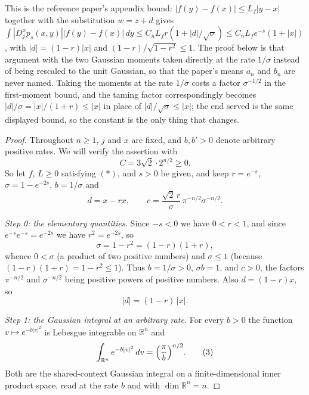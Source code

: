 \begin{lemma}
This is the reference paper's appendix bound: $|f(y)-f(x)| \leq L_f|y-x|$ together with
the substitution $w = z + d$ gives
$\int|D_j^xp_s(x,y)||f(y)-f(x)|\,dy \leq C_nL_fr(1+|d|/\sqrt\sigma) \leq C_nL_fe^{-s}(1+|x|)$,
with $|d| = (1-r)|x|$ and $(1-r)/\sqrt{1-r^2} \leq 1$.  The proof below is that argument
with the two Gaussian moments taken directly at the rate $1/\sigma$ instead of being
rescaled to the unit Gaussian, so that the paper's means $a_n$ and $b_n$ are never
named.  Taking the moments at the rate $1/\sigma$ costs a factor $\sigma^{-1/2}$ in the
first-moment bound, and the taming factor correspondingly becomes
$|d|/\sigma = |x|/(1+r) \leq |x|$ in place of $|d|/\sqrt\sigma \leq |x|$; the end served
is the same displayed bound, so the constant is the only thing that changes.
\end{lemma}
\begin{proof}
Throughout $n \geq 1$, $j$ and $x$ are fixed, and $b, b' > 0$ denote arbitrary positive
rates.  We will verify the assertion with
\[
  C = 3\sqrt2\cdot2^{n/2} \geq 0 .
\]
So let $f$, $L \geq 0$ satisfying $(*)$, and $s > 0$ be given, and keep
$r = e^{-s}$, $\sigma = 1-e^{-2s}$, $b = 1/\sigma$ and
\[
  d = x - rx , \qquad
  c = \frac{\sqrt2\,r}{\sigma}\,\pi^{-n/2}\sigma^{-n/2} .
\]

\emph{Step 0: the elementary quantities.}
Since $-s < 0$ we have $0 < r < 1$, and since $e^{-s}e^{-s} = e^{-2s}$ we have
$r^2 = e^{-2s}$, so
\begin{equation*}
  \sigma = 1-r^2 = (1-r)(1+r) , \tag{1}
\end{equation*}
whence $0 < \sigma$ (a product of two positive numbers) and $\sigma \leq 1$ (because
$(1-r)(1+r) = 1-r^2 \leq 1$).  Thus $b = 1/\sigma > 0$, $\sigma b = 1$, and $c > 0$,
the factors $\pi^{-n/2}$ and $\sigma^{-n/2}$ being positive powers of positive numbers.
Also $d = (1-r)x$, so
\begin{equation*}
  |d| = (1-r)\,|x| . \tag{2}
\end{equation*}

\emph{Step 1: the Gaussian integral at an arbitrary rate.}
For every $b > 0$ the function $v \mapsto e^{-b|v|^2}$ is Lebesgue integrable on
$\mathbb{R}^n$ and
\begin{equation*}
  \int_{\mathbb{R}^n} e^{-b|v|^2}\,dv = \Bigl(\frac{\pi}{b}\Bigr)^{n/2} .
  \tag{3}
\end{equation*}
Both are the shared-context Gaussian integral on a finite-dimensional inner product
space, read at the rate $b$ and with $\dim\mathbb{R}^n = n$.


\end{proof}
